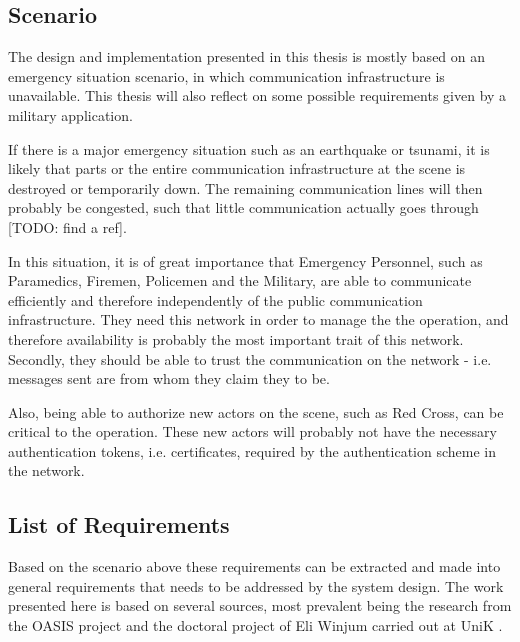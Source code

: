 \subsection{Scenario}
The design and implementation presented in this thesis is mostly based on an
emergency situation scenario, in which communication infrastructure is
unavailable. This thesis will also reflect on some possible requirements given
by a military application.

If there is a major emergency situation such as an earthquake or tsunami, it is
likely that parts or the entire communication infrastructure at the scene
is destroyed or temporarily down. The remaining communication lines will then
probably be congested, such that little communication actually goes through
[TODO: find a ref].

In this situation, it is of great importance that Emergency Personnel, such as
Paramedics, Firemen, Policemen and the Military, are able to communicate
efficiently and therefore independently of the public communication
infrastructure. They need this network in order to manage the the operation, and
therefore availability is probably the most important trait of this network.
Secondly, they should be able to trust the communication on the network - i.e.
messages sent are from whom they claim they to be.

Also, being able to authorize new actors on the scene, such as Red Cross, can be
critical to the operation. These new actors will probably not have the necessary
authentication tokens, i.e. certificates, required by the authentication scheme
in the network.

\subsection{List of Requirements}
Based on the scenario above these requirements can be extracted and made into
general requirements that needs to be addressed by the system design. The work
presented here is based on several sources, most prevalent being the research
from the OASIS project \cite{oasis_report} \cite{5683058} \cite{nyre2009secure}
and the doctoral project of Eli Winjum carried out at UniK
\cite{ffi_2005_04015}.


